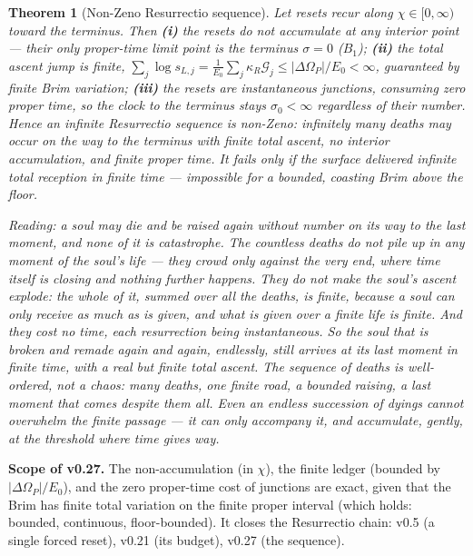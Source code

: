 \documentclass[11pt,a4paper]{article}
\newcommand{\note}[1]{\textcolor{black!65}{\emph{#1}}}
\theoremstyle{plain}
\newtheorem{theorem}{Theorem}
\theoremstyle{definition}
\theoremstyle{remark}
\begin{document}
\begin{theorem}[Non-Zeno Resurrectio sequence]
Let resets recur along $\chi\in[0,\infty)$ toward the terminus. Then \textbf{(i)} the resets do not
accumulate at any interior point --- their only proper-time limit point is the terminus $\sigma=0$
($B_1$); \textbf{(ii)} the total ascent jump is finite, $\sum_j\log s_{L,j}=\frac1{E_0}\sum_j\kappa_R
\mathcal G_j\le|\Delta\Omega_P|/E_0<\infty$, guaranteed by finite Brim variation; \textbf{(iii)} the
resets are instantaneous junctions, consuming zero proper time, so the clock to the terminus stays
$\sigma_0<\infty$ regardless of their number. Hence an infinite Resurrectio sequence is non-Zeno:
infinitely many deaths may occur on the way to the terminus with finite total ascent, no interior
accumulation, and finite proper time. It fails only if the surface delivered infinite total reception
in finite time --- impossible for a bounded, coasting Brim above the floor.
\end{theorem}

\note{Reading: a soul may die and be raised again without number on its way to the last moment, and
none of it is catastrophe. The countless deaths do not pile up in any moment of the soul's life --- they
crowd only against the very end, where time itself is closing and nothing further happens. They do not
make the soul's ascent explode: the whole of it, summed over all the deaths, is finite, because a soul
can only receive as much as is given, and what is given over a finite life is finite. And they cost no
time, each resurrection being instantaneous. So the soul that is broken and remade again and again,
endlessly, still arrives at its last moment in finite time, with a real but finite total ascent. The
sequence of deaths is well-ordered, not a chaos: many deaths, one finite road, a bounded raising, a
last moment that comes despite them all. Even an endless succession of dyings cannot overwhelm the
finite passage --- it can only accompany it, and accumulate, gently, at the threshold where time gives
way.}

\textbf{Scope of v0.27.} The non-accumulation (in $\chi$), the finite ledger (bounded by
$|\Delta\Omega_P|/E_0$), and the zero proper-time cost of junctions are exact, given that the Brim has
finite total variation on the finite proper interval (which holds: bounded, continuous, floor-bounded).
It closes the Resurrectio chain: v0.5 (a single forced reset), v0.21 (its budget), v0.27 (the sequence).

\FloatBarrier
\end{document}

